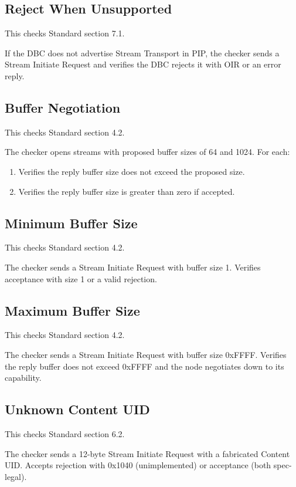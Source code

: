 \subsection{Reject When Unsupported}

This checks Standard section 7.1.

If the DBC does not advertise Stream Transport in PIP, the checker sends a
Stream Initiate Request and verifies the DBC rejects it with OIR or an error
reply.

\subsection{Buffer Negotiation}

This checks Standard section 4.2.

The checker opens streams with proposed buffer sizes of 64 and 1024.  For each:
\begin{enumerate}
\item Verifies the reply buffer size does not exceed the proposed size.
\item Verifies the reply buffer size is greater than zero if accepted.
\end{enumerate}

\subsection{Minimum Buffer Size}

This checks Standard section 4.2.

The checker sends a Stream Initiate Request with buffer size 1.  Verifies
acceptance with size 1 or a valid rejection.

\subsection{Maximum Buffer Size}

This checks Standard section 4.2.

The checker sends a Stream Initiate Request with buffer size 0xFFFF.  Verifies
the reply buffer does not exceed 0xFFFF and the node negotiates down to its
capability.

\subsection{Unknown Content UID}

This checks Standard section 6.2.

The checker sends a 12-byte Stream Initiate Request with a fabricated Content
UID.  Accepts rejection with 0x1040 (unimplemented) or acceptance (both
spec-legal).

